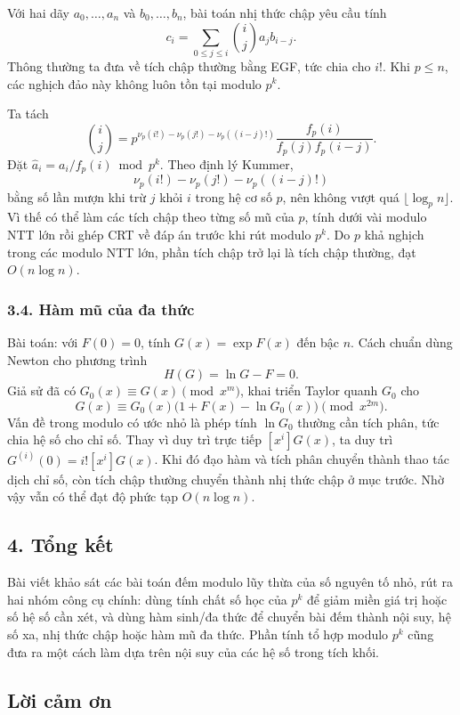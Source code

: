 \documentclass[11pt]{article}
\begin{document}
Với hai dãy \(a_0,\ldots,a_n\) và \(b_0,\ldots,b_n\), bài toán nhị thức chập
yêu cầu tính
\[
  c_i=\sum_{0\le j\le i}\binom ij a_jb_{i-j}.
\]
Thông thường ta đưa về tích chập thường bằng EGF, tức chia cho \(i!\). Khi
\(p\le n\), các nghịch đảo này không luôn tồn tại modulo \(p^k\).

Ta tách
\[
  \binom ij =
  p^{\nu_p(i!)-\nu_p(j!)-\nu_p((i-j)!)}
  \frac{f_p(i)}{f_p(j)f_p(i-j)}.
\]
Đặt \(\widehat a_i=a_i/f_p(i)\bmod p^k\). Theo định lý Kummer,
\[
  \nu_p(i!)-\nu_p(j!)-\nu_p((i-j)!)
\]
bằng số lần mượn khi trừ \(j\) khỏi \(i\) trong hệ cơ số \(p\), nên không vượt
quá \(\lfloor\log_p n\rfloor\). Vì thế có thể làm các tích chập theo từng số
mũ của \(p\), tính dưới vài modulo NTT lớn rồi ghép CRT về đáp án trước khi
rút modulo \(p^k\). Do \(p\) khả nghịch trong các modulo NTT lớn, phần tích
chập trở lại là tích chập thường, đạt \(O(n\log n)\).

\subsubsection*{3.4. Hàm mũ của đa thức}

Bài toán: với \(F(0)=0\), tính \(G(x)=\exp F(x)\) đến bậc \(n\). Cách chuẩn
dùng Newton cho phương trình
\[
  H(G)=\ln G-F=0.
\]
Giả sử đã có \(G_0(x)\equiv G(x)\pmod {x^m}\), khai triển Taylor quanh \(G_0\)
cho
\[
  G(x)\equiv G_0(x)\bigl(1+F(x)-\ln G_0(x)\bigr)\pmod {x^{2m}}.
\]
Vấn đề trong modulo có ước nhỏ là phép tính \(\ln G_0\) thường cần tích phân,
tức chia hệ số cho chỉ số. Thay vì duy trì trực tiếp \([x^i]G(x)\), ta duy trì
\(G^{(i)}(0)=i![x^i]G(x)\). Khi đó đạo hàm và tích phân chuyển thành thao tác
dịch chỉ số, còn tích chập thường chuyển thành nhị thức chập ở mục trước. Nhờ
vậy vẫn có thể đạt độ phức tạp \(O(n\log n)\).

\subsection*{4. Tổng kết}

Bài viết khảo sát các bài toán đếm modulo lũy thừa của số nguyên tố nhỏ, rút
ra hai nhóm công cụ chính: dùng tính chất số học của \(p^k\) để giảm miền giá
trị hoặc số hệ số cần xét, và dùng hàm sinh/đa thức để chuyển bài đếm thành
nội suy, hệ số xa, nhị thức chập hoặc hàm mũ đa thức. Phần tính tổ hợp modulo
\(p^k\) cũng đưa ra một cách làm dựa trên nội suy của các hệ số trong tích
khối.

\subsection*{Lời cảm ơn}
\end{document}
